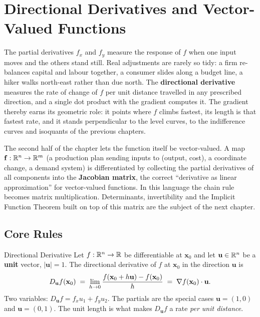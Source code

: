 \chapter{Directional Derivatives and Vector-Valued Functions}

The partial derivatives $f_{x}$ and $f_{y}$ measure the response of $f$
when one input moves and the others stand still. Real adjustments are
rarely so tidy: a firm re-balances capital and labour together, a consumer
slides along a budget line, a hiker walks north-east rather than due
north. The \textbf{directional derivative} measures the rate of change of
$f$ per unit distance travelled in any prescribed direction, and a single
dot product with the gradient computes it. The gradient thereby earns its
geometric role: it points where $f$ climbs fastest, its length is that
fastest rate, and it stands perpendicular to the level curves, to the
indifference curves and isoquants of the previous chapters.

The second half of the chapter lets the function itself be vector-valued.
A map $\mathbf{f}:\mathbb{R}^{n}\to\mathbb{R}^{m}$ (a production plan sending inputs to
(output, cost), a coordinate change, a demand system) is differentiated
by collecting the partial derivatives of all components into the
\textbf{Jacobian matrix}, the correct ``derivative as linear
approximation'' for vector-valued functions. In this language the chain
rule becomes matrix multiplication. Determinants, invertibility and the
Implicit Function Theorem built on top of this matrix are the subject of
the next chapter.

\section{Core Rules}

\begin{rulebox}{Directional Derivative}
Let $f:\mathbb{R}^{n}\to\mathbb{R}$ be differentiable at $\mathbf{x}_{0}$ and let
$\mathbf{u}\in\mathbb{R}^{n}$ be a \textbf{unit} vector, $|\mathbf{u}|=1$. The
directional derivative of $f$ at $\mathbf{x}_{0}$ in the direction
$\mathbf{u}$ is
\[
  D_{\mathbf{u}}f(\mathbf{x}_{0})
  \;=\; \lim_{h\to 0}\frac{f(\mathbf{x}_{0}+h\mathbf{u})
        -f(\mathbf{x}_{0})}{h}
  \;=\; \nabla f(\mathbf{x}_{0})\cdot\mathbf{u} .
\]
Two variables: $D_{\mathbf{u}}f=f_{x}u_{1}+f_{y}u_{2}$. The partials are
the special cases $\mathbf{u}=(1,0)$ and $\mathbf{u}=(0,1)$. The unit
length is what makes $D_{\mathbf{u}}f$ a rate \emph{per unit distance}.
\end{rulebox}

